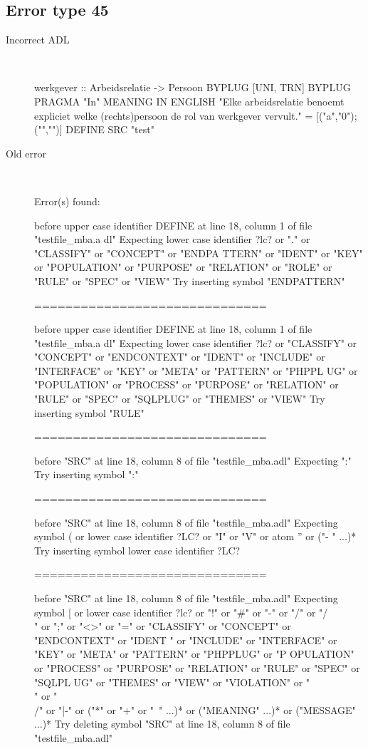 \hrulefill

\subsection{Error type 45}
  \begin{description}
  \item[Incorrect ADL]~\\
\begin{adl}
werkgever :: Arbeidsrelatie -> Persoon 
BYPLUG [UNI, TRN] BYPLUG
PRAGMA "In"
MEANING IN ENGLISH "Elke arbeidsrelatie benoemt expliciet welke (rechts)persoon de rol van werkgever vervult."
= [("a","0");("","")]
DEFINE SRC "test"\end{adl}
  \item[Old error]~\\
\begin{haskell}
Error(s) found:

before upper case identifier DEFINE at line 18, column 1 of file "testfile_mba.a
dl"
Expecting lower case identifier ?lc? or "." or "CLASSIFY" or "CONCEPT" or "ENDPA
TTERN" or "IDENT" or "KEY" or "POPULATION" or "PURPOSE" or "RELATION" or "ROLE"
or "RULE" or "SPEC" or "VIEW"
Try inserting symbol "ENDPATTERN"

==============================

before upper case identifier DEFINE at line 18, column 1 of file "testfile_mba.a
dl"
Expecting lower case identifier ?lc? or "CLASSIFY" or "CONCEPT" or "ENDCONTEXT"
or "IDENT" or "INCLUDE" or "INTERFACE" or "KEY" or "META" or "PATTERN" or "PHPPL
UG" or "POPULATION" or "PROCESS" or "PURPOSE" or "RELATION" or "RULE" or "SPEC"
or "SQLPLUG" or "THEMES" or "VIEW"
Try inserting symbol "RULE"

==============================

before "SRC" at line 18, column 8 of file "testfile_mba.adl"
Expecting ":"
Try inserting symbol ":"

==============================

before "SRC" at line 18, column 8 of file "testfile_mba.adl"
Expecting symbol ( or lower case identifier ?LC? or "I" or "V" or atom '' or ("-
" ...)*
Try inserting symbol lower case identifier ?LC?

==============================

before "SRC" at line 18, column 8 of file "testfile_mba.adl"
Expecting symbol [ or lower case identifier ?lc? or "!" or "#" or "-" or "/" or
"/\\" or ";" or "<>" or "=" or "CLASSIFY" or "CONCEPT" or "ENDCONTEXT" or "IDENT
" or "INCLUDE" or "INTERFACE" or "KEY" or "META" or "PATTERN" or "PHPPLUG" or "P
OPULATION" or "PROCESS" or "PURPOSE" or "RELATION" or "RULE" or "SPEC" or "SQLPL
UG" or "THEMES" or "VIEW" or "VIOLATION" or "\\" or "\\/" or "|-" or ("*" or "+"
 or "~" ...)* or ("MEANING" ...)* or ("MESSAGE" ...)*
Try deleting symbol "SRC" at line 18, column 8 of file "testfile_mba.adl"


\end{haskell}
\end{description}
